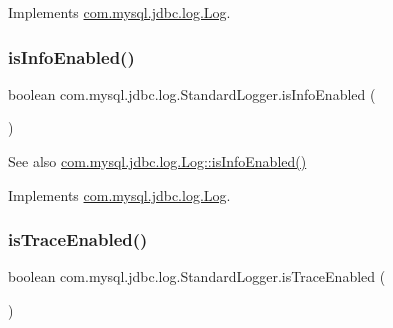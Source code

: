 Implements \mbox{\hyperlink{interfacecom_1_1mysql_1_1jdbc_1_1log_1_1_log_acc3f527d8a1e3143e312eb4368c3632a}{com.\+mysql.\+jdbc.\+log.\+Log}}.

\mbox{\label{classcom_1_1mysql_1_1jdbc_1_1log_1_1_standard_logger_a843810f899e33afae8e6ac8d579c32cf}} 
\subsubsection{\texorpdfstring{is\+Info\+Enabled()}{isInfoEnabled()}}
{\footnotesize\ttfamily boolean com.\+mysql.\+jdbc.\+log.\+Standard\+Logger.\+is\+Info\+Enabled (\begin{DoxyParamCaption}{ }\end{DoxyParamCaption})}

\begin{DoxySeeAlso}{See also}
\mbox{\hyperlink{interfacecom_1_1mysql_1_1jdbc_1_1log_1_1_log_a8ca112798ee938dfb0fa06ffca504922}{com.\+mysql.\+jdbc.\+log.\+Log\+::is\+Info\+Enabled()}} 
\end{DoxySeeAlso}


Implements \mbox{\hyperlink{interfacecom_1_1mysql_1_1jdbc_1_1log_1_1_log_a8ca112798ee938dfb0fa06ffca504922}{com.\+mysql.\+jdbc.\+log.\+Log}}.

\mbox{\label{classcom_1_1mysql_1_1jdbc_1_1log_1_1_standard_logger_ab41b3c2553938c1ed5d76a20aff834b4}} 
\subsubsection{\texorpdfstring{is\+Trace\+Enabled()}{isTraceEnabled()}}
{\footnotesize\ttfamily boolean com.\+mysql.\+jdbc.\+log.\+Standard\+Logger.\+is\+Trace\+Enabled (\begin{DoxyParamCaption}{ }\end{DoxyParamCaption})}

